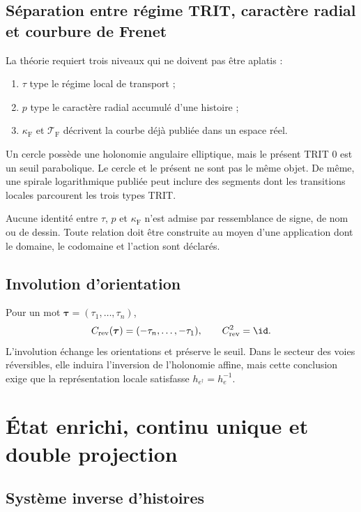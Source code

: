 \section{Séparation entre régime TRIT, caractère radial et courbure de Frenet}

La théorie requiert trois niveaux qui ne doivent pas être aplatis :
\begin{enumerate}
\item \(\tau\) type le régime local de transport ;
\item \(p\) type le caractère radial accumulé d'une histoire ;
\item \(\kappa_{\mathrm{F}}\) et \(\mathcal T_{\mathrm{F}}\) décrivent la courbe déjà publiée dans un espace réel.
\end{enumerate}
Un cercle possède une holonomie angulaire elliptique, mais le présent TRIT \(0\) est un seuil parabolique. Le cercle et le présent ne sont pas le même objet. De même, une spirale logarithmique publiée peut inclure des segments dont les transitions locales parcourent les trois types TRIT.

\begin{principle}
Aucune identité entre \(\tau\), \(p\) et \(\kappa_{\mathrm{F}}\) n'est admise par ressemblance de signe, de nom ou de dessin. Toute relation doit être construite au moyen d'une application dont le domaine, le codomaine et l'action sont déclarés.
\end{principle}

\section{Involution d'orientation}

Pour un mot \(\boldsymbol\tau=(\tau_1,\ldots,\tau_n)\),
\[
 C_{\mathrm{rev}}(\boldsymbol\tau)
 =(-\tau_n,\ldots,-\tau_1),
 \qquad C_{\mathrm{rev}}^2=\id.
\]
L'involution échange les orientations et préserve le seuil. Dans le secteur des voies réversibles, elle induira l'inversion de l'holonomie affine, mais cette conclusion exige que la représentation locale satisfasse \(h_{e^\dagger}=h_e^{-1}\).

\chapter{État enrichi, continu unique et double projection}

\section{Système inverse d'histoires}

